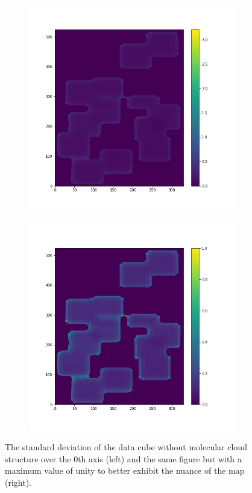\documentclass{article}
\begin{document}
\begin{figure}[h]
    \centering
    \captionsetup{justification=centering}
    \begin{subfigure}[H]{0.4\linewidth}
        \includegraphics[width=\linewidth]{Photos/std_nn.png}
    \end{subfigure}
    \begin{subfigure}[H]{0.4\linewidth}
        \includegraphics[width=\linewidth]{Photos/std_nn_capped.png}
    \end{subfigure}
    \captionsetup{justification=centering,margin=1cm}
    \caption{The standard deviation of the data cube without molecular cloud structure over the 0th axis (left) and the same figure but with a maximum value of unity to better exhibit the nuance of the map (right).}
    \label{fig:std_nn}
\end{figure}
\end{document}
